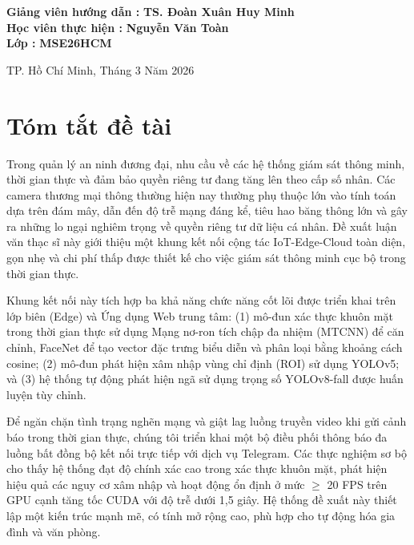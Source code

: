 \documentclass[12pt,a4paper]{article}
\begin{document}
\begin{titlepage}
\begin{center}
        \begin{flushright}
            \textbf{Giảng viên hướng dẫn :} \textbf{TS. Đoàn Xuân Huy Minh} \\
            \vspace{0.5cm}
            \textbf{Học viên thực hiện : } \textbf{Nguyễn Văn Toàn} \\
            \vspace{0.5cm}
            \textbf{Lớp :} \textbf{MSE26HCM}
        \end{flushright}
        
        \vfill
        TP. Hồ Chí Minh, Tháng 3 Năm 2026
    \end{center}
\end{titlepage}
\hypersetup{pageanchor=true}

\newpage

\section*{Tóm tắt đề tài}
Trong quản lý an ninh đương đại, nhu cầu về các hệ thống giám sát thông minh, thời gian thực và đảm bảo quyền riêng tư đang tăng lên theo cấp số nhân. Các camera thương mại thông thường hiện nay thường phụ thuộc lớn vào tính toán dựa trên đám mây, dẫn đến độ trễ mạng đáng kể, tiêu hao băng thông lớn và gây ra những lo ngại nghiêm trọng về quyền riêng tư dữ liệu cá nhân. Đề xuất luận văn thạc sĩ này giới thiệu một khung kết nối cộng tác IoT-Edge-Cloud toàn diện, gọn nhẹ và chi phí thấp được thiết kế cho việc giám sát thông minh cục bộ trong thời gian thực.

Khung kết nối này tích hợp ba khả năng chức năng cốt lõi được triển khai trên lớp biên (Edge) và Ứng dụng Web trung tâm: (1) mô-đun xác thực khuôn mặt trong thời gian thực sử dụng Mạng nơ-ron tích chập đa nhiệm (MTCNN) để căn chỉnh, FaceNet để tạo vector đặc trưng biểu diễn và phân loại bằng khoảng cách cosine; (2) mô-đun phát hiện xâm nhập vùng chỉ định (ROI) sử dụng YOLOv5; và (3) hệ thống tự động phát hiện ngã sử dụng trọng số YOLOv8-fall được huấn luyện tùy chỉnh.

Để ngăn chặn tình trạng nghẽn mạng và giật lag luồng truyền video khi gửi cảnh báo trong thời gian thực, chúng tôi triển khai một bộ điều phối thông báo đa luồng bất đồng bộ kết nối trực tiếp với dịch vụ Telegram. Các thực nghiệm sơ bộ cho thấy hệ thống đạt độ chính xác cao trong xác thực khuôn mặt, phát hiện hiệu quả các nguy cơ xâm nhập và hoạt động ổn định ở mức $\ge$ 20 FPS trên GPU cạnh tăng tốc CUDA với độ trễ dưới 1,5 giây. Hệ thống đề xuất này thiết lập một kiến trúc mạnh mẽ, có tính mở rộng cao, phù hợp cho tự động hóa gia đình và văn phòng.
\end{document}
